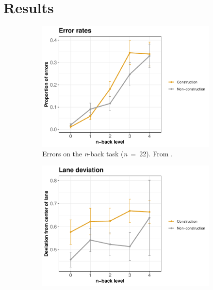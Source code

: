 
\section{Results}\label{sec:results}
\begin{figure}
  \centering
  \begin{subfigure}[b]{0.3\textwidth}
    \centering
    \includegraphics[width=\textwidth]{images/error_rates.pdf}
    \caption{Errors on the \textit{n}-back task (\textit{n}\ =\ 22). From \citet{DeMooij2021}.}
    \label{fig:errors}
  \end{subfigure}
  \hfill
  \begin{subfigure}[b]{0.3\textwidth}
    \centering
    \includegraphics[width=\textwidth]{images/lane_deviation.pdf}

\end{subfigure}
\end{figure}
